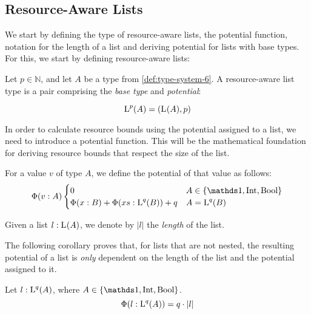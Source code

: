 \subsection{Resource-Aware Lists}

We start by defining the type of resource-aware lists, the potential function, notation for the length of a list and deriving potential for lists with base types. For this, we start by defining resource-aware lists:

\begin{definition}\label{def:ra-list}
   Let \(p \in \mathbb{N}\), and let \(A\) be a type from \cref{def:type-system-6}. A resource-aware list type is a pair comprising the \emph{base type} and \emph{potential}:

   \[
      \text{L}^{p}(A) = (\text{L}^{}(A), p)
   \]
\end{definition}

In order to calculate resource bounds using the potential assigned to a list, we need to introduce a potential function. This will be the mathematical foundation for deriving resource bounds that respect the size of the list. 

\begin{definition}\label{def:potential-function}
   For a value \(v\) of type \(A\), we define the potential of that value as follows:
   \[
      \Phi(v : A) \begin{cases}
         0                                            & A \in \{\unit, \typeint, \bool\}\\
         \Phi(x : B) + \Phi(xs : \ralist{q}{B}) + q   & A = \ralist{q}{B}
      \end{cases}
   \]
\end{definition}

\begin{definition}\label{def:list-length}
   Given a list \(l : \text{L}^{}(A)\), we denote by \(|l|\) the \emph{length} of the list.
\end{definition}

The following corollary proves that, for lists that are not nested, the resulting potential of a list is \emph{only} dependent on the length of the list and the potential assigned to it.

\begin{corollary}\label{cor:potential-list}
   Let \(l : \text{L}^{q}(A)\), where \(A \in \{\unit, \typeint, \bool\}\). 
   \[
      \Phi(l : \text{L}^{q}(A)) = q \cdot |l|
   \]
\end{corollary}

